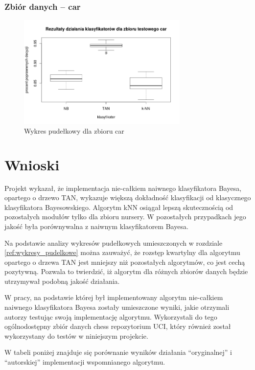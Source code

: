 \documentclass[paper=a4, fontsize=11pt]{scrartcl} %
\numberwithin{equation}{section} %
\numberwithin{figure}{section} %
\numberwithin{table}{section} %
\begin{document}
\subsubsection{Zbiór danych -- car}

\begin{figure}[!h]
 \centering
\includegraphics[width=0.75\textwidth]{car_pic.png}
 \caption{Wykres pudełkowy dla zbioru car}
 \label{fig:model_drzewa}
\end{figure}

\clearpage

\section{Wnioski}
Projekt wykazał, że implementacja nie-całkiem naiwnego klasyfikatora Bayesa, opartego o drzewo TAN, wykazuje większą dokładność klasyfikacji od klasycznego klasyfikatora Bayesowskiego. Algorytm kNN  osiągał lepszą skutecznością od pozostałych modułów tylko dla zbioru nursery. W pozostałych przypadkach jego jakość była porównywalna z naiwnym klasyfikatorem Bayesa.

Na podstawie analizy wykresów pudełkowych umieszczonych w rozdziale  \ref{ref:wykresy_pudelkowe} można zauważyć, że rozstęp kwartylny dla algorytmu opartego o drzewa TAN jest mniejszy niż pozostałych algorytmów, co jest cechą pozytywną. Pozwala to twierdzić, iż algorytm dla różnych zbiorów danych będzie utrzymywał podobną jakość działania.

W pracy, na podstawie której był implementowany algorytm nie-całkiem naiwnego klasyfikatora Bayesa zostały umieszczone wyniki, jakie otrzymali autorzy testując swoją implementację algorytmu. Wykorzystali do tego ogólnodostępny zbiór danych chess repozytorium UCI, który również został wykorzystany do testów w niniejszym projekcie.

W tabeli poniżej znajduje się porównanie wyników działania "`oryginalnej"'  i "`autorskiej"'  implementacji wspomnianego algorytmu.
\end{document}
